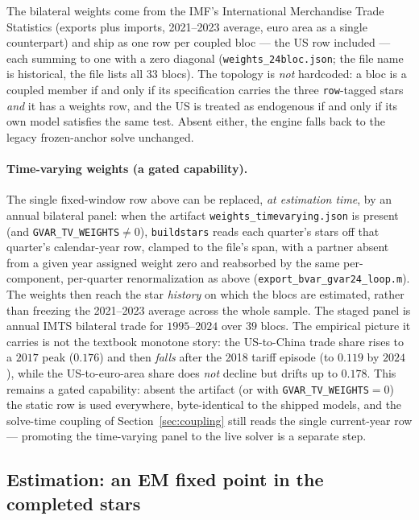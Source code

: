 \documentclass[11pt]{article}
\theoremstyle{plain}
\theoremstyle{remark}
\begin{document}
The bilateral weights come from the IMF's International Merchandise
Trade Statistics (exports plus imports, 2021--2023 average, euro area
as a single counterpart) and ship as one row per coupled bloc --- the
US row included --- each summing to one with a zero diagonal
(\texttt{weights\_24bloc.json}; the file name is historical, the file
lists all 33 blocs). The topology is \emph{not} hardcoded: a bloc is a
coupled member if and only if its specification carries the three
\texttt{row}-tagged stars \emph{and} it has a weights row, and the US is
treated as endogenous if and only if its own model satisfies the same
test. Absent either, the engine falls back to the legacy frozen-anchor
solve unchanged.

\paragraph{Time-varying weights (a gated capability).} The single
fixed-window row above can be replaced, \emph{at estimation time}, by an
annual bilateral panel: when the artifact
\texttt{weights\_timevarying.json} is present (and
\texttt{GVAR\_TV\_WEIGHTS}${\neq}0$), \texttt{buildstars} reads each
quarter's stars off that quarter's calendar-year row, clamped to the
file's span, with a partner absent from a given year assigned weight
zero and reabsorbed by the same per-component, per-quarter
renormalization as above (\texttt{export\_bvar\_gvar24\_loop.m}). The
weights then reach the star \emph{history} on which the blocs are
estimated, rather than freezing the 2021--2023 average across the whole
sample. The staged panel is annual IMTS bilateral trade for
$1995$--$2024$ over $39$ blocs. The empirical picture it carries is not
the textbook monotone story: the US-to-China trade share rises to a
$2017$ peak ($0.176$) and then \emph{falls} after the 2018 tariff
episode (to $0.119$ by $2024$), while the US-to-euro-area share does
\emph{not} decline but drifts up to $0.178$. This remains a gated
capability: absent the artifact (or with \texttt{GVAR\_TV\_WEIGHTS}${=}0$)
the static row is used everywhere, byte-identical to the shipped models,
and the solve-time coupling of Section~\ref{sec:coupling} still reads the
single current-year row --- promoting the time-varying panel to the
live solver is a separate step.

\subsection{Estimation: an EM fixed point in the completed stars}\label{sec:gvarem}
\end{document}
